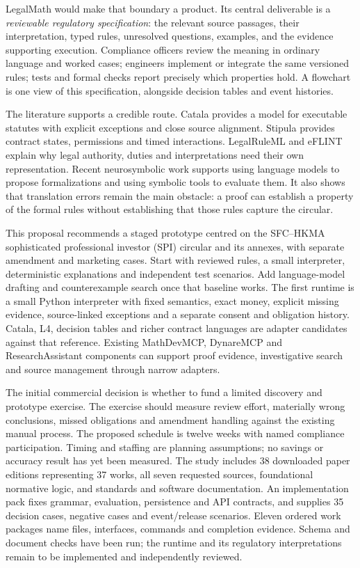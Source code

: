 \documentclass[11pt,a4paper]{article}
\begin{document}
LegalMath would make that boundary a product. Its central deliverable is a
\emph{reviewable regulatory specification}: the relevant source passages, their
interpretation, typed rules, unresolved questions, examples, and the evidence
supporting execution. Compliance officers review the meaning in ordinary language
and worked cases; engineers implement or integrate the same versioned rules; tests
and formal checks report precisely which properties hold. A flowchart is one view
of this specification, alongside decision tables and event histories.

The literature supports a credible route. Catala provides a model for executable
statutes with explicit exceptions and close source alignment. Stipula provides
contract states, permissions and timed interactions. LegalRuleML and eFLINT explain
why legal authority, duties and interpretations need their own representation.
Recent neurosymbolic work supports using language models to propose formalizations
and using symbolic tools to evaluate them. It also shows that translation errors
remain the main obstacle: a proof can establish a property of the formal rules
without establishing that those rules capture the circular.

This proposal recommends a staged prototype centred on the SFC--HKMA sophisticated
professional investor (SPI) circular and its annexes, with separate amendment and
marketing cases. Start with reviewed rules, a small interpreter, deterministic
explanations and independent test scenarios. Add language-model drafting and
counterexample search once that baseline works. The first runtime is a small
Python interpreter with fixed semantics, exact money, explicit missing evidence,
source-linked exceptions and a separate consent and obligation history. Catala,
L4, decision tables and richer contract languages are adapter candidates against
that reference.
Existing MathDevMCP, DynareMCP and ResearchAssistant components can support proof
evidence, investigative search and source management through narrow adapters.

The initial commercial decision is whether to fund a limited discovery and
prototype exercise.
The exercise should measure review effort, materially wrong conclusions, missed
obligations and amendment handling against the existing manual process. The
proposed schedule is twelve weeks with named compliance participation. Timing and
staffing are planning assumptions; no savings or accuracy result has yet been
measured. The study includes 38 downloaded paper editions representing 37 works,
all seven requested sources, foundational normative logic, and standards and
software documentation. An implementation pack fixes grammar, evaluation,
persistence and API contracts, and supplies 35 decision cases, negative cases
and event/release scenarios. Eleven ordered work packages name files, interfaces,
commands and completion evidence. Schema and document checks have been run;
the runtime and its regulatory interpretations remain to be implemented and
independently reviewed.

\clearpage
\begingroup
\small
\setlength{\parskip}{0pt}
\tableofcontents
\endgroup
\clearpage





\clearpage
\begingroup
\raggedright


\endgroup
\end{document}
